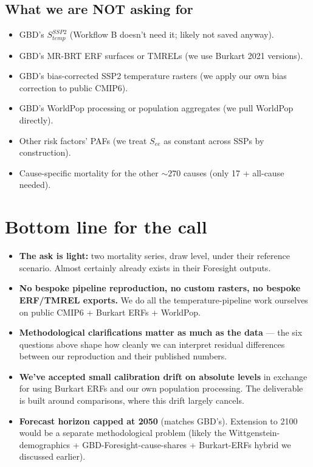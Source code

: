 \documentclass[11pt]{article}
\begin{document}
\subsection{What we are NOT asking for}

\begin{itemize}
\item GBD's $S^{SSP2}_{temp}$ (Workflow B doesn't need it; likely not saved anyway).
\item GBD's MR-BRT ERF surfaces or TMRELs (we use Burkart 2021 versions).
\item GBD's bias-corrected SSP2 temperature rasters (we apply our own bias correction to public CMIP6).
\item GBD's WorldPop processing or population aggregates (we pull WorldPop directly).
\item Other risk factors' PAFs (we treat $S_{ee}$ as constant across SSPs by construction).
\item Cause-specific mortality for the other ${\sim}270$ causes (only 17 + all-cause needed).
\end{itemize}

\section{Bottom line for the call}

\begin{itemize}
\item \textbf{The ask is light:} two mortality series, draw level, under their reference scenario. Almost certainly already exists in their Foresight outputs.
\item \textbf{No bespoke pipeline reproduction, no custom rasters, no bespoke ERF/TMREL exports.} We do all the temperature-pipeline work ourselves on public CMIP6 + Burkart ERFs + WorldPop.
\item \textbf{Methodological clarifications matter as much as the data} --- the six questions above shape how cleanly we can interpret residual differences between our reproduction and their published numbers.
\item \textbf{We've accepted small calibration drift on absolute levels} in exchange for using Burkart ERFs and our own population processing. The deliverable is built around comparisons, where this drift largely cancels.
\item \textbf{Forecast horizon capped at 2050} (matches GBD's). Extension to 2100 would be a separate methodological problem (likely the Wittgenstein-demographics + GBD-Foresight-cause-shares + Burkart-ERFs hybrid we discussed earlier).
\end{itemize}
\end{document}
